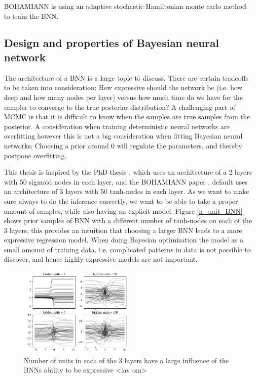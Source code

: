 BOHAMIANN is using an adaptive stochastic Hamiltonian monte carlo method to train the BNN. 

\subsection{Design and properties of Bayesian neural network}
The architecture of a BNN is a large topic to discuss. There are certain tradeoffs to be taken into
consideration: How expressive should the network be (i.e. how deep and how many nodes per layer)
versus how much time do we have for the sampler to converge to the true posterior distribution? A
challenging part of MCMC is that it is difficult to know when the samples are true samples from the
posterior. A consideration when training deterministic neural networks are overfitting however this
is not a big consideration when fitting Bayesian neural networks; Choosing a prior around 0 will
regulate the parameters, and thereby postpone overfitting. 

This thesis is inspired by the PhD thesis \cite{PhDthesis}, which uses an architecture of a 2 layers
with 50 sigmoid nodes in each layer, and the BOHAMIANN paper \cite{BOHAMIANN}, default uses an architecture
of 3 layers with 50 tanh-nodes in each layer. As we want to make sure always to do the 
inference correctly, we want to be able to take a proper amount of samples, while also
having an explicit model. Figure \eqref{n_unit_BNN} shows prior samples of BNN with a different
number of tanh-nodes on each of the 3 layers, this provides an intuition that choosing a larger
BNN leads to a more expressive regression model. When doing Bayesian optimization the model as a small
amount of training data, i.e. complicated patterns in data is not possible to discover, and hence 
highly expressive models are not important. 

\begin{figure}[H]
    \centering
    \includegraphics[width=0.5\textwidth]{Pictures/bayesian_nn_prior_samples_hidden_units.pdf}
    \caption{Number of units in each of the 3 layers have a large influence of the BNNs ability to be expressive <lav om>}
    \label{n_unit_BNN}
\end{figure}

